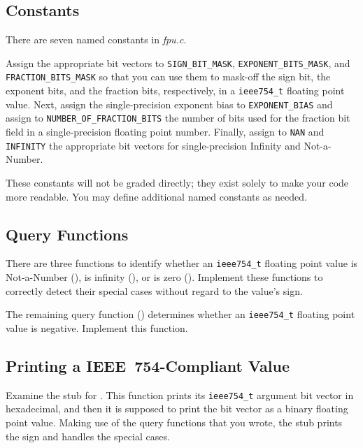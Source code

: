     \subsection{Constants}

    There are seven named constants in \textit{fpu.c}.

    Assign the appropriate bit vectors to \lstinline{SIGN_BIT_MASK}, \lstinline{EXPONENT_BITS_MASK}, and \lstinline{FRACTION_BITS_MASK} so that you can use them to mask-off the sign bit, the exponent bits, and the fraction bits, respectively, in a \lstinline{ieee754_t} floating point value.
    Next, assign the single-precision exponent bias to \lstinline{EXPONENT_BIAS} and assign to \lstinline{NUMBER_OF_FRACTION_BITS} the number of bits used for the fraction bit field in a single-precision floating point number.
    Finally, assign to \lstinline{NAN} and \lstinline{INFINITY} the appropriate bit vectors for single-precision Infinity and Not-a-Number.

    These constants will not be graded directly;
    they exist solely to make your code more readable.
    You may define additional named constants as needed.

    \subsection{Query Functions}

    There are three functions to identify whether an \lstinline{ieee754_t} floating point value is Not-a-Number (), is infinity (), or is zero ().
    Implement these functions to correctly detect their special cases without regard to the value's sign.

    The remaining query function () determines whether an \lstinline{ieee754_t} floating point value is negative.
    Implement this function.

    \subsection{Printing a IEEE~754-Compliant Value}

    Examine the stub for .
    This function prints its \lstinline{ieee754_t} argument bit vector in hexadecimal, and then it is supposed to print the bit vector as a binary floating point value.
    Making use of the query functions that you wrote, the stub prints the sign and handles the special cases.

